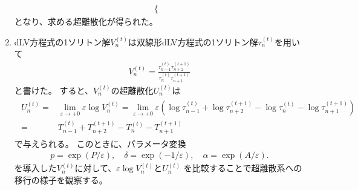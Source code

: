\documentclass{jsarticle}
\begin{document}
\begin{enumerate}
\begin{align}
\begin{cases}
\end{cases}
\end{align}
となり、求める超離散化が得られた。
\item 
dLV方程式の1ソリトン解$V_{n}^{(t)}$は双線形dLV方程式の1ソリトン解$\tau_{n}^{(t)}$を用いて
\begin{align}
V_{n}^{(t)}=\frac{\tau_{n-1}^{(t)}\tau_{n+2}^{(t+1)}}{\tau_{n}^{(t)}\tau_{n+1}^{(t+1)}}
\end{align}
と書けた。
すると、$V_{n}^{(t)}$の超離散化$U_{n}^{(t)}$は
\begin{align}
\begin{split}
U_{n}^{(t)}=&\lim_{\varepsilon\to+0}\varepsilon\log V_{n}^{(t)}
=\lim_{\varepsilon\to+0}\varepsilon\left(\log\tau_{n-1}^{(t)}+\log\tau_{n+2}^{(t+1)}-\log\tau_{n}^{(t)}-\log\tau_{n+1}^{(t+1)}\right)\\
=&T_{n-1}^{(t)}+T_{n+2}^{(t+1)}-T_{n}^{(t)}-T_{n+1}^{(t+1)}
\end{split}
\end{align}
で与えられる。
このときに、パラメータ変換
\begin{align}
p=\exp\left(P/\varepsilon\right),\quad
\delta=\exp\left(-1/\varepsilon\right),\quad
\alpha=\exp\left(A/\varepsilon\right).
\end{align}
を導入した$V_{n}^{(t)}$に対して、$\varepsilon\log V_{n}^{(t)}$と$U_{n}^{(t)}$
を比較することで超離散系への移行の様子を観察する。
\end{enumerate}
\end{document}
